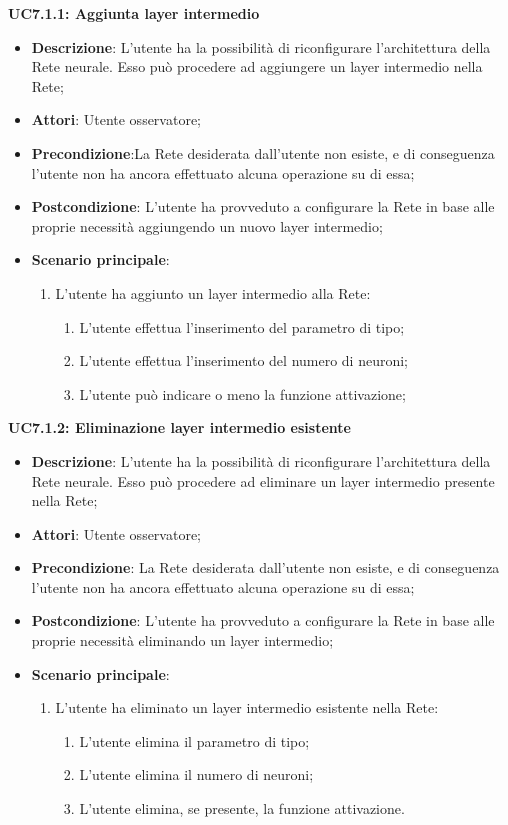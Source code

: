 \textbf{UC7.1.1: Aggiunta layer intermedio}
\label{UC7.1.1: Aggiunta layer intemrdio}
\noindent
\begin{itemize}
\item \textbf{Descrizione}: L'utente ha la possibilit\`a di riconfigurare l'architettura della Rete neurale. Esso pu\`o procedere ad aggiungere un layer intermedio nella Rete;
\item \textbf{Attori}: Utente osservatore;
\item \textbf{Precondizione}:La Rete desiderata dall'utente non esiste, e di conseguenza l'utente non ha ancora effettuato alcuna operazione su di essa;
\item \textbf{Postcondizione}: L'utente ha provveduto a configurare la Rete in base alle proprie necessit\`a aggiungendo un nuovo layer intermedio;
\item \textbf{Scenario principale}:
\begin{enumerate}
\item L'utente ha aggiunto un layer intermedio alla Rete:
\begin{enumerate}
\item L'utente effettua l'inserimento del parametro di tipo;
\item L'utente effettua l'inserimento del numero di neuroni;
\item L'utente pu\`o indicare o meno la funzione attivazione;
\end{enumerate}
\end{enumerate}
\end{itemize}

\textbf{UC7.1.2: Eliminazione layer intermedio esistente}
\label{UC7.1.2: Eliminazione layer intermedio esistente}
\noindent
\begin{itemize}
\item \textbf{Descrizione}: L'utente ha la possibilit\`a di riconfigurare l'architettura della Rete neurale. Esso pu\`o procedere ad eliminare un layer intermedio presente nella Rete;
\item \textbf{Attori}: Utente osservatore;
\item \textbf{Precondizione}: La Rete desiderata dall'utente non esiste, e di conseguenza l'utente non ha ancora effettuato alcuna operazione su di essa;
\item \textbf{Postcondizione}: L'utente ha provveduto a configurare la Rete in base alle proprie necessit\`a eliminando un layer intermedio;
\item \textbf{Scenario principale}:
\begin{enumerate}
\item L'utente ha eliminato un layer intermedio esistente nella Rete:
\begin{enumerate}
\item L'utente elimina il parametro di tipo;
\item L'utente elimina il numero di neuroni;
\item L'utente elimina, se presente, la funzione attivazione.
\end{enumerate}
\end{enumerate}
\end{itemize}

